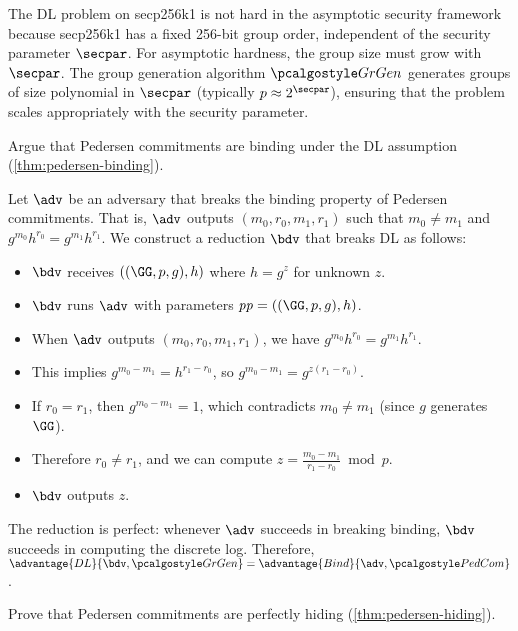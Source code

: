 \ifsolutions
\begin{mysolution}
  The DL problem on secp256k1 is not hard in the asymptotic security framework because secp256k1 has a fixed 256-bit group order, independent of the security parameter $\secpar$.
  For asymptotic hardness, the group size must grow with $\secpar$.
  The group generation algorithm $\grgen$ generates groups of size polynomial in $\secpar$ (typically $p \approx 2^\secpar$), ensuring that the problem scales appropriately with the security parameter.
\end{mysolution}
\fi

\begin{exercise}\label{ex:pedersen-binding}
  Argue that Pedersen commitments are binding under the DL assumption (\autoref{thm:pedersen-binding}).
\end{exercise}

\ifsolutions
\begin{mysolution}
  Let $\adv$ be an adversary that breaks the binding property of Pedersen commitments.
  That is, $\adv$ outputs $(m_0, r_0, m_1, r_1)$ such that $m_0 \neq m_1$ and $g^{m_0}h^{r_0} = g^{m_1}h^{r_1}$.
  We construct a \ppt reduction $\bdv$ that breaks DL as follows:
  \begin{itemize}
    \item $\bdv$ receives $(\gparam, h)$ where $h = g^z$ for unknown $z$.
    \item $\bdv$ runs $\adv$ with parameters $\params = (\gparam, h)$.
    \item When $\adv$ outputs $(m_0, r_0, m_1, r_1)$, we have $g^{m_0}h^{r_0} = g^{m_1}h^{r_1}$.
    \item This implies $g^{m_0 - m_1} = h^{r_1 - r_0}$, so $g^{m_0 - m_1} = g^{z(r_1 - r_0)}$.
    \item If $r_0 = r_1$, then $g^{m_0 - m_1} = 1$, which contradicts $m_0 \neq m_1$ (since $g$ generates $\GG$).
    \item Therefore $r_0 \neq r_1$, and we can compute $z = \frac{m_0 - m_1}{r_1 - r_0} \bmod p$.
    \item $\bdv$ outputs $z$.
  \end{itemize}
  The reduction is perfect: whenever $\adv$ succeeds in breaking binding, $\bdv$ succeeds in computing the discrete log.
  Therefore, $\advantage{DL}{\bdv, \grgen} = \advantage{Bind}{\adv, \algo{PedCom}}$.
\end{mysolution}
\fi

\begin{exercise}\label{ex:pedersen-hiding}
  Prove that Pedersen commitments are perfectly hiding (\autoref{thm:pedersen-hiding}).
\end{exercise}

